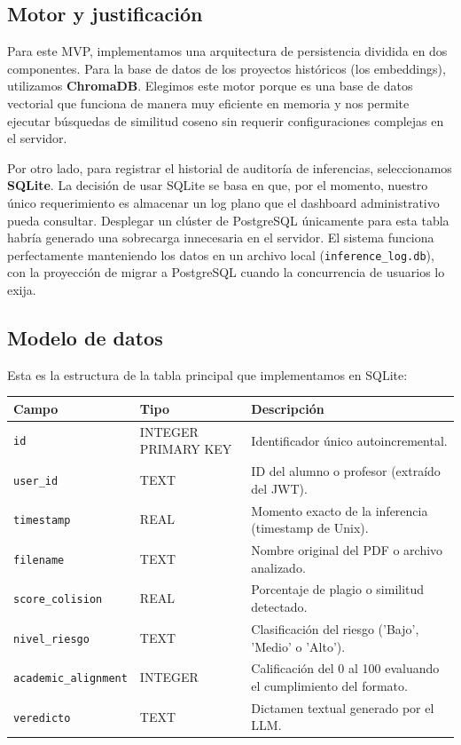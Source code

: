 

\subsection{Motor y justificación}

Para este MVP, implementamos una arquitectura de persistencia dividida en dos componentes. Para la base de datos de los proyectos históricos (los embeddings), utilizamos \textbf{ChromaDB}. Elegimos este motor porque es una base de datos vectorial que funciona de manera muy eficiente en memoria y nos permite ejecutar búsquedas de similitud coseno sin requerir configuraciones complejas en el servidor.

Por otro lado, para registrar el historial de auditoría de inferencias, seleccionamos \textbf{SQLite}. La decisión de usar SQLite se basa en que, por el momento, nuestro único requerimiento es almacenar un log plano que el dashboard administrativo pueda consultar. Desplegar un clúster de PostgreSQL únicamente para esta tabla habría generado una sobrecarga innecesaria en el servidor. El sistema funciona perfectamente manteniendo los datos en un archivo local (\texttt{inference\_log.db}), con la proyección de migrar a PostgreSQL cuando la concurrencia de usuarios lo exija.

\subsection{Modelo de datos}

Esta es la estructura de la tabla principal que implementamos en SQLite:

\begin{tabular}{@{}llp{5.5cm}@{}}
  \toprule
  Campo & Tipo & Descripción \\
  \midrule
  \texttt{id} & INTEGER PRIMARY KEY & Identificador único autoincremental. \\
  \texttt{user\_id} & TEXT & ID del alumno o profesor (extraído del JWT). \\
  \texttt{timestamp} & REAL & Momento exacto de la inferencia (timestamp de Unix). \\
  \texttt{filename} & TEXT & Nombre original del PDF o archivo analizado. \\
  \texttt{score\_colision} & REAL & Porcentaje de plagio o similitud detectado. \\
  \texttt{nivel\_riesgo} & TEXT & Clasificación del riesgo ('Bajo', 'Medio' o 'Alto'). \\
  \texttt{academic\_alignment} & INTEGER & Calificación del 0 al 100 evaluando el cumplimiento del formato. \\
  \texttt{veredicto} & TEXT & Dictamen textual generado por el LLM. \\
  \bottomrule
\end{tabular}

